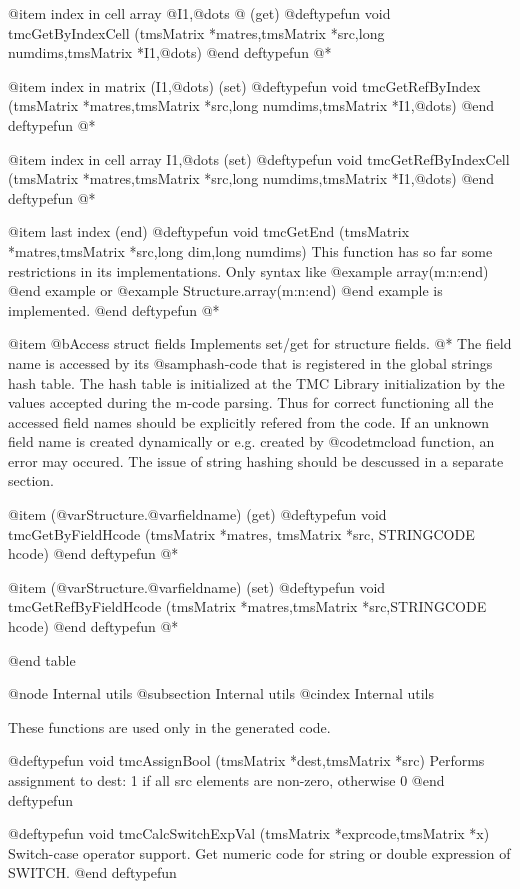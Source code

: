@item  index in cell array @{I1,@dots{} @}   (get)
@deftypefun void tmcGetByIndexCell (tmsMatrix *matres,tmsMatrix *src,long numdims,tmsMatrix *I1,@dots{})
@end deftypefun
@*

@item  index in matrix (I1,@dots{})   (set)
@deftypefun void tmcGetRefByIndex (tmsMatrix *matres,tmsMatrix *src,long numdims,tmsMatrix *I1,@dots{})
@end deftypefun
@*

@item  index in cell array {I1,@dots{}}   (set)
@deftypefun void tmcGetRefByIndexCell (tmsMatrix *matres,tmsMatrix *src,long numdims,tmsMatrix *I1,@dots{})
@end deftypefun
@*

@item  last index  (end)   
@deftypefun void  tmcGetEnd (tmsMatrix *matres,tmsMatrix *src,long dim,long numdims)
This function has so far some restrictions in its implementations. Only syntax like
@example
array(m:n:end)
@end example
or
@example
Structure.array(m:n:end)
@end example
is implemented.
@end deftypefun
@*



@item @b{Access struct fields}
Implements set/get for structure fields. @*
The field name  is accessed by its @samp{hash-code} that is registered in the global strings hash table.
The hash table is initialized at the TMC Library initialization by the values accepted during the m-code parsing.
Thus for correct functioning all the accessed field names should be explicitly refered from  the code. If an unknown  
field name is created dynamically or e.g. created by @code{tmcload} function, an error may occured. The issue of string 
hashing should be descussed in a separate section.

@item   (@var{Structure}.@var{fieldname})   (get)
@deftypefun void tmcGetByFieldHcode (tmsMatrix *matres, tmsMatrix *src, STRINGCODE hcode)
@end deftypefun
@*

@item   (@var{Structure}.@var{fieldname})   (set)
@deftypefun void tmcGetRefByFieldHcode (tmsMatrix *matres,tmsMatrix *src,STRINGCODE hcode)
@end deftypefun
@*



@end table

@node Internal utils
@subsection  Internal utils
@cindex  Internal utils

These functions are used only in the generated code.

@deftypefun void tmcAssignBool (tmsMatrix *dest,tmsMatrix *src)
Performs assignment to dest: 1 if all src elements are non-zero, otherwise 0
@end deftypefun

@deftypefun void tmcCalcSwitchExpVal (tmsMatrix *exprcode,tmsMatrix *x)
Switch-case operator support. Get numeric code for string or double expression of SWITCH.
@end deftypefun
 
